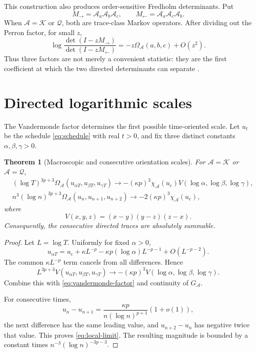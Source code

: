 \documentclass[11pt]{article}
\newtheorem{theorem}{Theorem}[section]
\theoremstyle{definition}
\theoremstyle{remark}
\newcommand{\cK}{\mathcal K}
\newcommand{\cA}{\mathcal A}
\newcommand{\cQ}{\mathcal Q}
\newcommand{\uc}{u_{\mathrm c}}
\begin{document}
This construction also produces order-sensitive Fredholm determinants.  Put
\begin{equation}\label{eq:directed-determinants}
 M_\to=\cA_a\cA_b\cA_c,
 \qquad M_\leftarrow=\cA_a\cA_c\cA_b.
\end{equation}
When $\cA=\cK$ or $\cQ$, both are trace-class Markov operators.  After
dividing out the Perron factor, for small $z$,
\begin{equation}\label{eq:det-difference}
 \log\frac{\det(I-zM_\to)}{\det(I-zM_\leftarrow)}
 =-z\Omega_{\cA}(a,b,c)+O(z^2).
\end{equation}
Thus three factors are not merely a convenient statistic: they are the first
coefficient at which the two directed determinants can separate
\citep{Bornemann2010,Baladi2018}.

\section{Directed logarithmic scales}
\label{sec:schedule}

The Vandermonde factor determines the first possible time-oriented scale.
Let $u_t$ be the schedule \eqref{eq:schedule} with real $t>0$, and fix three
distinct constants $\alpha,\beta,\gamma>0$.

\begin{theorem}[Macroscopic and consecutive orientation scales]
\label{thm:schedule}
For $\cA=\cK$ or $\cA=\cQ$,
\begin{align}
 &(\log T)^{3p+3}
 \Omega_{\cA}(u_{\alpha T},u_{\beta T},u_{\gamma T})
 \longrightarrow
 -(\kappa p)^3\chi_{\cA}(\uc)
 V(\log\alpha,\log\beta,\log\gamma),
 \label{eq:macro-limit}\\
 &n^3(\log n)^{3p+3}
 \Omega_{\cA}(u_n,u_{n+1},u_{n+2})
 \longrightarrow-2(\kappa p)^3\chi_{\cA}(\uc),
 \label{eq:local-limit}
\end{align}
where
\begin{equation}\label{eq:v-definition}
 V(x,y,z)=(x-y)(y-z)(z-x).
\end{equation}
Consequently, the consecutive directed traces are absolutely summable.
\end{theorem}

\begin{proof}
Let $L=\log T$.  Uniformly for fixed $\alpha>0$,
\[
 u_{\alpha T}
 =\uc+\kappa L^{-p}
 -\kappa p(\log\alpha)L^{-p-1}+O(L^{-p-2}).
\]
The common $\kappa L^{-p}$ term cancels from all differences.  Hence
\[
 L^{3p+3}V(u_{\alpha T},u_{\beta T},u_{\gamma T})
 \longrightarrow-(\kappa p)^3
 V(\log\alpha,\log\beta,\log\gamma).
\]
Combine this with \eqref{eq:vandermonde-factor} and continuity of $G_{\cA}$.

For consecutive times,
\[
 u_n-u_{n+1}
 =\frac{\kappa p}{n(\log n)^{p+1}}(1+o(1)),
\]
the next difference has the same leading value, and
$u_{n+2}-u_n$ has negative twice that value.  This proves
\eqref{eq:local-limit}.  The resulting magnitude is bounded by a constant
times $n^{-3}(\log n)^{-3p-3}$.
\end{proof}
\end{document}
